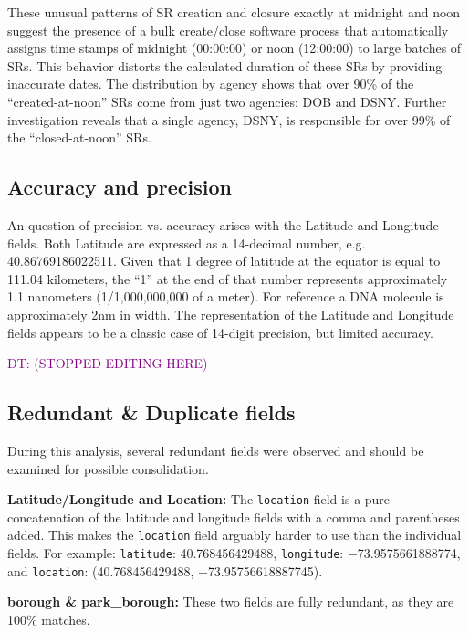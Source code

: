 \documentclass[linenumber]{jdsart}
\newcommand{\dt}[1]{\textcolor{purple}{DT: (#1)}}
\begin{document}
These unusual patterns of SR creation and closure exactly at midnight 
and noon suggest the presence of a bulk create/close software process 
that automatically assigns time stamps of midnight (00:00:00) or noon 
(12:00:00) to large batches of SRs. This behavior distorts the 
calculated duration of these SRs by providing inaccurate dates. The 
distribution by agency shows that over 90\% of the ``created-at-noon'' 
SRs come from just two agencies: DOB and DSNY. Further investigation 
reveals that a single agency, DSNY, is responsible for over 99\% of 
the ``closed-at-noon'' SRs.



	
\subsection{Accuracy and precision}
\label{sec:precision}

An question of precision vs. accuracy arises with the Latitude 
and Longitude fields. Both Latitude are expressed as 
a 14-decimal number, e.g. 40.86769186022511. Given 
that 1 degree of latitude at the equator is equal to 111.04 
kilometers, the ``1'' at the end of that number represents 
approximately 1.1 nanometers (1/1,000,000,000 of a meter). For 
reference a DNA molecule is approximately 2nm in width. The 
representation of the Latitude and Longitude fields appears to be a 
classic case of 14-digit precision, but limited accuracy. 

\dt{STOPPED EDITING HERE}

\subsection{Redundant \& Duplicate fields}
\label{sec:duplicates}

During this analysis, several redundant fields were observed and should 
be examined for possible consolidation.

\textbf{Latitude/Longitude and Location:} The \texttt{location} field 
is a pure concatenation of the latitude and longitude fields with a 
comma and parentheses added. This makes the \texttt{location} field 
arguably harder to use than the individual fields. For example:  
\texttt{latitude}: 40.768456429488, \texttt{longitude}: $-$73.9575661888774, 
and \texttt{location}: (40.768456429488, $-$73.95756618887745).

\textbf{borough \& park\_borough:} These two fields are fully redundant, 
as they are 100\% matches.
\end{document}
